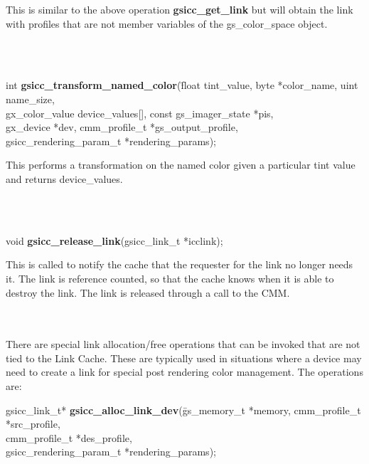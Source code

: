 \documentclass[12pt,notitlepage]{article}
\begin{document}
\begin{minipage}[h]{6.0in}
This is similar to the above operation {\bf gsicc\_get\_link} but will obtain the link with profiles that are not member variables of the gs\_color\_space object.
\end{minipage}\\
\\

\begin{tabbing}
\noindent int {\bf gsicc\_transform\_named\_color}(\=float tint\_value, byte *color\_name, uint name\_size,\\
\> gx\_color\_value device\_values[], const gs\_imager\_state *pis, \\
\> gx\_device *dev, cmm\_profile\_t *gs\_output\_profile, \\
\> gsicc\_rendering\_param\_t *rendering\_params);\\
\end{tabbing}

\begin{minipage}[h]{6.0in}
This performs a transformation on the named color given a particular tint value and returns device\_values.
\end{minipage}\\
\\

\begin{tabbing}
\noindent void {\bf gsicc\_release\_link}(gsicc\_link\_t *icclink);\\
\end{tabbing}

\begin{minipage}[h]{6.0in}
	This is called to notify the cache that the requester for the link no longer needs it.  	
	The link is reference counted, so that the cache knows when it is able to destroy
	the link.  The link is released through a call to the CMM.
\end{minipage}\\
\\

\noindent There are special link allocation/free operations that can be invoked that are not tied to the
Link Cache.   These are typically used in situations where a device may need to create a link
for special post rendering color management.   The operations are:

\begin{tabbing}
\noindent gsicc\_link\_t* {\bf gsicc\_alloc\_link\_dev}(\=gs\_memory\_t *memory, cmm\_profile\_t *src\_profile,\\
\> cmm\_profile\_t *des\_profile, \\
\> gsicc\_rendering\_param\_t *rendering\_params);\\
\end{tabbing}
\end{document}
